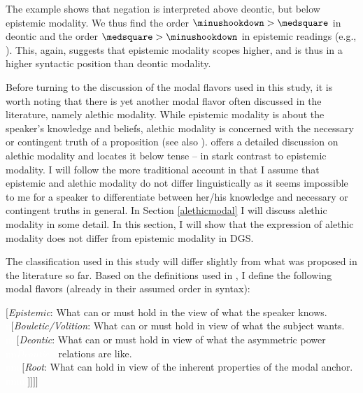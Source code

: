 \noindent The example shows that negation is interpreted above deontic, but below epistemic modality. We thus find the order $\minushookdown > \medsquare$ in deontic and the order $ \medsquare > \minushookdown$ in epistemic readings (e.g., \citealt{butler2003minimalist, iatridou2010scopal}). This, again, suggests that epistemic modality scopes higher, and is thus in a higher syntactic position than deontic modality.

Before turning to the discussion of the modal flavors used in this study, it is worth noting that there is yet another modal flavor often discussed in the literature, namely alethic modality. While epistemic modality is about the speaker's knowledge and beliefs, alethic modality is concerned with the necessary or contingent truth of a proposition (see also \citealt[28]{nuyts2000epistemic}). \citet{cinque1999adverbs} offers a detailed discussion on alethic modality and locates it below tense -- in stark contrast to epistemic modality. I will follow the more traditional account in that I assume that epistemic and alethic modality do not differ linguistically as it seems impossible to me for a speaker to differentiate between her/his knowledge and necessary or contingent truths in general. In Section \ref{alethicmodal} I will discuss alethic modality in some detail. In this section, I will show that the expression of alethic modality does not differ from epistemic modality in DGS.

The classification used in this study will differ slightly from what was proposed in the literature so far. Based on the definitions used in \citet{bross2017swabian}, I define the following modal flavors (already in their assumed order in syntax):

\begin{exe}
\ex\label{bsp:differentmodalitiesused} 
{\footnotesize $[$\textit{Epistemic}: What can or must hold in the view of what the speaker knows. \\
\textcolor{white}{n}$[$\textit{Bouletic/Volition}: What can or must hold in view of what the subject wants. \\
\textcolor{white}{nn}$[$\textit{Deontic}: What can or must hold in view of what the asymmetric power  \\
\textcolor{white}{nn\textit{Deontic} : }relations are like.\\
\textcolor{white}{nnn}$[$\textit{Root}: What can hold in view of the inherent properties of the modal anchor. \\
\textcolor{white}{nnnn}$]]]]$ }
\end{exe} 

